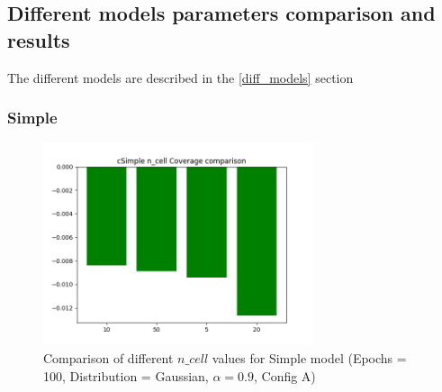

\subsection{Different models parameters comparison and results} \label{comp_model_param}

The different models are described in the \ref{diff_models} section

\subsubsection{Simple} \label{comp_simple}

\begin{figure}[H]
    \centering
    \includegraphics[width=300px]{plots/hist/a/cSimple/n_cell/Coverage.png}
    \caption{Comparison of different $n\_cell$ values for Simple model (Epochs = 100, Distribution = Gaussian, $\alpha = 0.9$, Config A)}
    \label{fig:comp_simple}
\end{figure}

